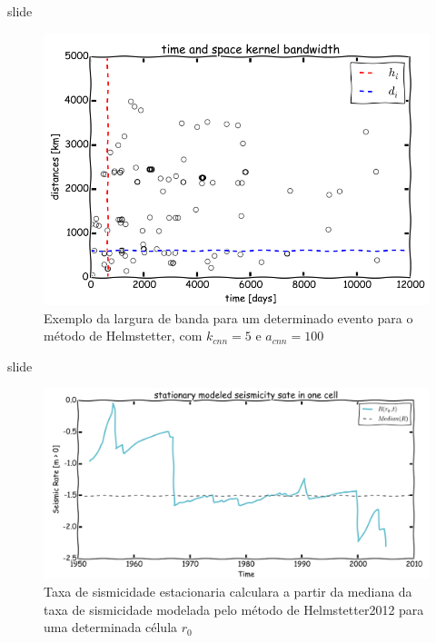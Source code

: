 \documentclass[ucs,8pt]{beamer}
\begin{document}
\begin{frame}{slide}


\begin{figure}[H]
  \centering
  \includegraphics[height=.80\textheight]{helmstetter_hidi} 
  \caption{Exemplo da largura de banda para um determinado evento para o método de Helmstetter, com $k_{cnn} = 5$ e
  $a_{cnn} = 100$}
  \label{fig:h_hidi} 
\end{figure}


\end{frame}



\begin{frame}{slide}

\begin{figure}[H]
  \centering
  \includegraphics[height=.80\textheight]{helmstetter_stationary_a} 
  \caption{Taxa de sismicidade estacionaria calculara a partir da mediana da taxa de sismicidade
  modelada pelo método de Helmstetter2012 para uma determinada célula $r_0$}
  \label{fig:h_stationary} 
\end{figure}

\end{frame}
\end{document}
